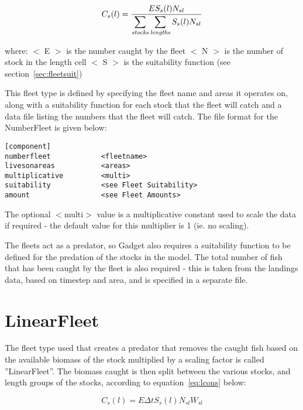 \documentclass[10pt,twoside]{book}
\begin{document}
\begin{equation}\label{eq:ncons}
C_{s}(l) = \frac{E S_{s}(l) N_{sl}}{\displaystyle \sum_{\it stocks} \sum_{\it lengths} S_{s}(l) N_{sl}}
\end{equation}

where:\newline
$<$ E $>$ is the number caught by the fleet\newline
$<$ N $>$ is the number of stock in the length cell\newline
$<$ S $>$ is the suitability function (see section~\ref{sec:fleetsuit})

\bigskip
This fleet type is defined by specifying the fleet name and areas it operates on, along with a suitability function for each stock that the fleet will catch and a data file listing the numbers that the fleet will catch.  The file format for the NumberFleet is given below:

{\small\begin{verbatim}
[component]
numberfleet            <fleetname>
livesonareas           <areas>
multiplicative         <multi>
suitability            <see Fleet Suitability>
amount                 <see Fleet Amounts>
\end{verbatim}}

The optional $<$multi$>$ value is a multiplicative constant used to scale the data if required - the default value for this multiplier is 1 (ie. no scaling).

\bigskip
The fleets act as a predator, so Gadget also requires a suitability function to be defined for the predation of the stocks in the model.  The total number of fish that has been caught by the fleet is also required - this is taken from the landings data, based on timestep and area, and is specified in a separate file.

\section{LinearFleet}\label{sec:linearfleet}
The fleet type used that creates a predator that removes the caught fish based on the available biomass of the stock multiplied by a scaling factor is called ''LinearFleet''.  The biomass caught is then split between the various stocks, and length groups of the stocks, according to equation~\ref{eq:lcons} below:

\begin{equation}\label{eq:lcons}
C_{s}(l) = E \Delta t S_{s}(l) N_{sl} W_{sl}
\end{equation}
\end{document}
